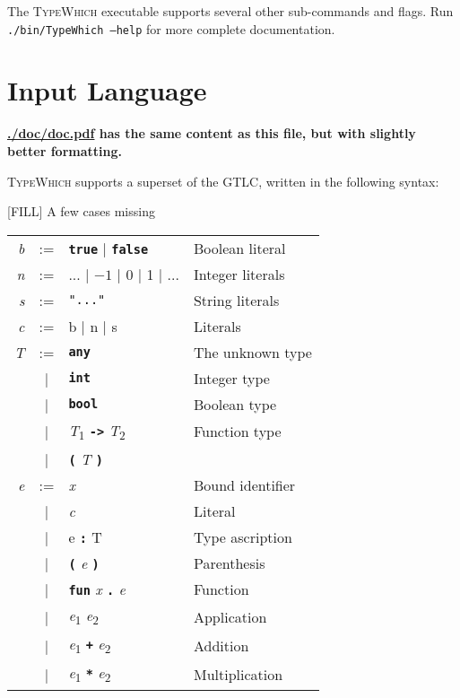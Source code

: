 \documentclass{article}
\newcommand{\system}{\textsc{TypeWhich}\xspace}
\newcommand{\kw}[1]{\textbf{\texttt{#1}}}
\newcommand{\metavar}[1]{\textit{#1}}
\begin{document}
The \system executable supports several other sub-commands and flags. 
Run \texttt{./bin/TypeWhich --help} for more complete documentation.

\section{Input Language}\label{input-lang-gtlc}

\textbf{\url{./doc/doc.pdf} has the same content as this file, but with
slightly better formatting.}

\system supports a superset of the GTLC, written in the following syntax:

[FILL] A few cases missing

\begin{tabular}{rcll}
\metavar{b} & := & \kw{true} | \kw{false} & Boolean literal \\
\metavar{n} & := & ... | $-1$ | 0 | 1 | ... & Integer literals \\
\metavar{s} & := & \texttt{"..."} & String literals \\
\metavar{c} & := & b | n | s & Literals \\
\metavar{T} & := & \kw{any} & The unknown type \\
            & |  & \kw{int} & Integer type \\
            & |  & \kw{bool} & Boolean type \\
            & |  & \metavar{T}\textsubscript{1} \kw{->} \metavar{T}\textsubscript{2} & Function type \\
            & |  & \kw{(} \metavar{T} \kw{)} \\
\metavar{e} & := & \textit{x}  & Bound identifier \\
            & |  & \metavar{c} & Literal \\
            & |  & e \kw{:} T  & Type ascription \\
            & |  & \kw{(} \metavar{e} \kw{)} & Parenthesis \\
            & |  & \kw{fun} \metavar{x} \kw{.} \metavar{e} & Function \\
            & |  & \metavar{e}\textsubscript{1} \metavar{e}\textsubscript{2}
                 & Application \\
            & |  & \metavar{e}\textsubscript{1} \kw{+} \metavar{e}\textsubscript{2}
                 & Addition \\
            & |  & \metavar{e}\textsubscript{1} \kw{*} \metavar{e}\textsubscript{2}
                 & Multiplication \\

\end{tabular}
\end{document}
